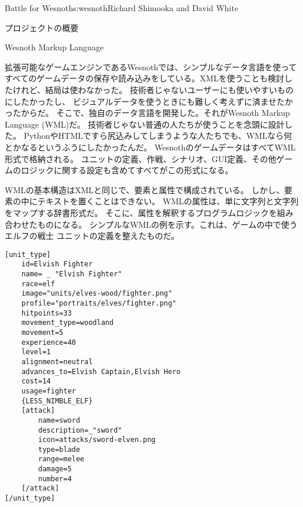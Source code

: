\begin{aosachapter}{Battle for Wesnoth}{s:wesnoth}{Richard Shimooka and David White}
\begin{aosasect1}{プロジェクトの概要}
\end{aosasect1}

\begin{aosasect1}{Wesnoth Markup Language}

拡張可能なゲームエンジンであるWesnothでは、シンプルなデータ言語を使って
すべてのゲームデータの保存や読み込みをしている。XMLを使うことも検討したけれど、結局は使わなかった。
技術者じゃないユーザーにも使いやすいものにしたかったし、
ビジュアルデータを使うときにも難しく考えずに済ませたかったからだ。
そこで、独自のデータ言語を開発した。それがWesnoth Markup Language (WML)だ。
技術者じゃない普通の人たちが使うことを念頭に設計した。
PythonやHTMLですら尻込みしてしまうような人たちでも、WMLなら何とかなるというふうにしたかったんだ。
WesnothのゲームデータはすべてWML形式で格納される。
ユニットの定義、作戦、シナリオ、GUI定義、その他ゲームのロジックに関する設定も含めてすべてがこの形式になる。

WMLの基本構造はXMLと同じで、要素と属性で構成されている。
しかし、要素の中にテキストを置くことはできない。
WMLの属性は、単に文字列と文字列をマップする辞書形式だ。
そこに、属性を解釈するプログラムロジックを組み合わせたものになる。
シンプルなWMLの例を示す。これは、ゲームの中で使うエルフの戦士
ユニットの定義を整えたものだ。

\begin{verbatim}
[unit_type]
    id=Elvish Fighter
    name= _ "Elvish Fighter"
    race=elf
    image="units/elves-wood/fighter.png"
    profile="portraits/elves/fighter.png"
    hitpoints=33
    movement_type=woodland
    movement=5
    experience=40
    level=1
    alignment=neutral
    advances_to=Elvish Captain,Elvish Hero
    cost=14
    usage=fighter
    {LESS_NIMBLE_ELF}
    [attack]
        name=sword
        description=_"sword"
        icon=attacks/sword-elven.png
        type=blade
        range=melee
        damage=5
        number=4
    [/attack]
[/unit_type]
\end{verbatim}


\end{aosasect1}
\end{aosachapter}
